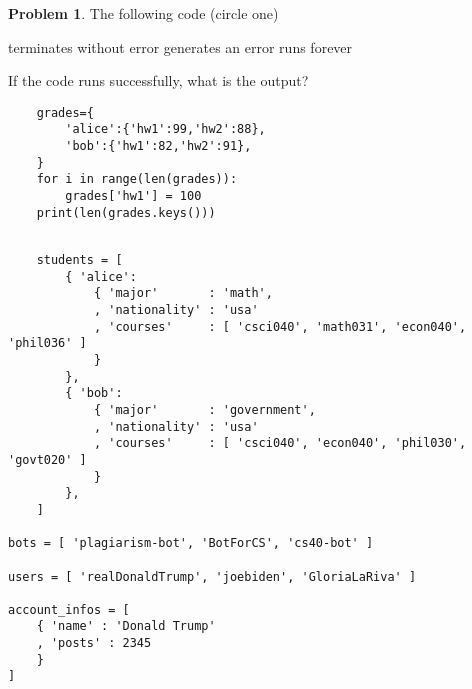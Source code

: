 \documentclass[10pt]{article}
\theoremstyle{definition}
\newtheorem{problem}{Problem}
\begin{document}
\begin{problem}
    The following code (circle one)

    \vspace{0.25in}
    \hspace{0.5in}terminates without error 
    \hspace{1in}generates an error
    \hspace{1in}runs forever
    \vspace{0.25in}

    \noindent
    If the code runs successfully, what is the output?
\end{problem}
\begin{lstlisting}
    grades={
        'alice':{'hw1':99,'hw2':88},
        'bob':{'hw1':82,'hw2':91},
    }
    for i in range(len(grades)):
        grades['hw1'] = 100
    print(len(grades.keys()))
\end{lstlisting}
\vspace{1.5in}

\newpage

\begin{lstlisting}

    students = [
        { 'alice': 
            { 'major'       : 'math',
            , 'nationality' : 'usa'
            , 'courses'     : [ 'csci040', 'math031', 'econ040', 'phil036' ]
            }
        },
        { 'bob': 
            { 'major'       : 'government',
            , 'nationality' : 'usa'
            , 'courses'     : [ 'csci040', 'econ040', 'phil030', 'govt020' ]
            }
        },
    ]

bots = [ 'plagiarism-bot', 'BotForCS', 'cs40-bot' ]

users = [ 'realDonaldTrump', 'joebiden', 'GloriaLaRiva' ]

account_infos = [
    { 'name' : 'Donald Trump'
    , 'posts' : 2345
    }
]


\end{lstlisting}
\end{document}
